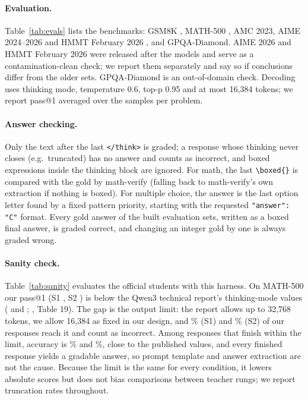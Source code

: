 

\paragraph{Evaluation.} Table~\ref{tab:evals} lists the benchmarks: GSM8K \citep{cobbe2021gsm8k},
MATH-500 \citep{hendrycks2021math,lightman2023verify}, AMC 2023, AIME 2024--2026 and HMMT
February 2026 \citep[the 2025/2026 sets from][]{matharena2025}, and GPQA-Diamond. AIME 2026 and HMMT February
2026 were released after the models and serve as a contamination-clean check; we report them
separately and say so if conclusions differ from the older sets. GPQA-Diamond \citep{rein2024gpqa}
is an out-of-domain check. Decoding uses thinking mode, temperature 0.6, top-p 0.95 and at most
16{,}384 tokens; we report pass@1 averaged over the samples per problem.



\paragraph{Answer checking.} Only the text after the last \verb|</think>| is graded; a response
whose thinking never closes (e.g.\ truncated) has no answer and counts as incorrect, and boxed
expressions inside the thinking block are ignored. For math, the last \verb|\boxed{}| is
compared with the gold by math-verify (falling back to math-verify's own extraction if nothing is
boxed). For multiple choice, the answer is the last option letter found by a fixed pattern
priority, starting with the requested \texttt{"answer": "C"} format. Every gold answer of the
built evaluation sets, written as a boxed final answer, is graded correct, and changing an
integer gold by one is always graded wrong.

\paragraph{Sanity check.} Table~\ref{tab:sanity} evaluates the official students with this
harness. On MATH-500 our pass@1 (S1 \sanOneMath{}, S2 \sanTwoMath{}) is below the Qwen3 technical
report's thinking-mode values (\sanOnePub{} and \sanTwoPub{}; \citealp{qwen3}, Table 19). The gap
is the output limit: the report allows up to 32{,}768 tokens, we allow 16{,}384 as fixed in our
design, and \sanOneTrunc{}\% (S1) and \sanTwoTrunc{}\% (S2) of our responses reach it and count as
incorrect. Among responses that finish within the limit, accuracy is \sanOneFin{}\% and
\sanTwoFin{}\%, close to the published values, and every finished response yields a gradable
answer, so prompt template and answer extraction are not the cause. Because the limit is the same
for every condition, it lowers absolute scores but does not bias comparisons between teacher rungs;
we report truncation rates throughout.

